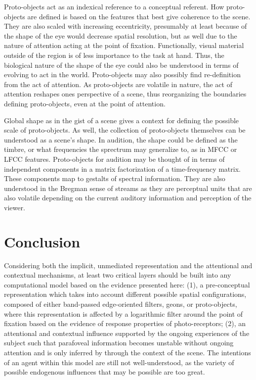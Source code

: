 Proto-objects act as an indexical reference to a conceptual referent.  How proto-objects are defined is based on the features that best give coherence to the scene.  They are also scaled with increasing eccentricity, presumably at least because of the shape of the eye would decrease spatial resolution, but as well due to the nature of attention acting at the point of fixation.  Functionally, visual material outside of the region is of less importance to the task at hand.  Thus, the biological nature of the shape of the eye could also be understood in terms of evolving to act in the world.  Proto-objects may also possibly find re-definition from the act of attention.  As proto-objects are volatile in nature, the act of attention reshapes ones perspective of a scene, thus reorganizing the boundaries defining proto-objects, even at the point of attention.

Global shape as in the gist of a scene gives a context for defining the possible scale of proto-objects.  As well, the collection of proto-objects themselves can be understood as a scene's shape.  In audition, the shape could be defined as the timbre, or what frequencies the sprectrum may generalize to, as in MFCC or LFCC features.  Proto-objects for audition may be thought of in terms of independent components in a matrix factorization of a time-frequency matrix.  These components map to gestalts of spectral information.  They are also understood in the Bregman sense of streams as they are perceptual units that are also volatile depending on the current auditory information and perception of the viewer.

\section{Conclusion}

Considering both the implicit, unmediated representation and the attentional and contextual mechanisms, at least two critical layers should be built into any computational model based on the evidence presented here:  (1), a pre-conceptual representation which takes into account different possible spatial configurations, composed of either band-passed edge-oriented filters, geons, or proto-objects, where this representation is affected by a logarithmic filter around the point of fixation based on the evidence of response properties of photo-receptors; (2), an attentional and contextual influence supported by the ongoing experiences of the subject such that parafoveal information becomes unstable without ongoing attention and is only inferred by through the context of the scene.  The intentions of an agent within this model are still not well-understood, as the variety of possible endogenous influences that may be possible are too great.  

